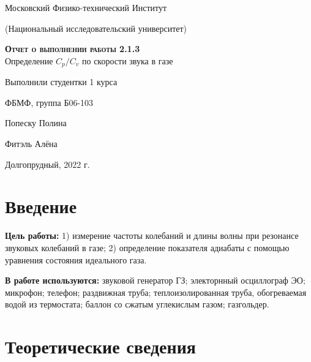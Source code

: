 \documentclass[12pt,a4paper]{article}
\begin{document}
\begin{titlepage}
  \begin{center}
    \huge
    Московский Физико-технический Институт
    
    (Национальный исследовательский университет)
    \vspace{0.5cm}

   
    \vspace{0.25cm}
 
    \vfill
 
    \vfill

    \textsc{\bf{Отчет о выполнении работы 2.1.3}}\\[3mm]
    
    {\LARGE  Определение $C_p/C_v$ по скорости звука в газе}
  \bigskip
    \vfill
    
\end{center}
\vfill
\begin{flushright}

    Выполнили студентки 1 курса
    
    ФБМФ, группа Б06-103

    Попеску Полина
    
    
    Фитэль Алёна

\end{flushright}
\bigskip


\vfill

\begin{center}
  Долгопрудный, 2022 г.
\end{center}
\end{titlepage}

\section{Введение}

\textbf{Цель работы:} 1) измерение частоты колебаний и длины волны при резонансе звуковых колебаний в газе; 2) определение показателя адиабаты с помощью уравнения состояния идеального газа.

\textbf{В работе используются:} звуковой генератор ГЗ; электорнный осциллограф ЭО; микрофон; телефон; раздвижная труба; теплоизолированная труба, обогреваемая водой из термостата; баллон со сжатым углекислым газом; газгольдер.

\section{Теоретические сведения}
\end{document}
